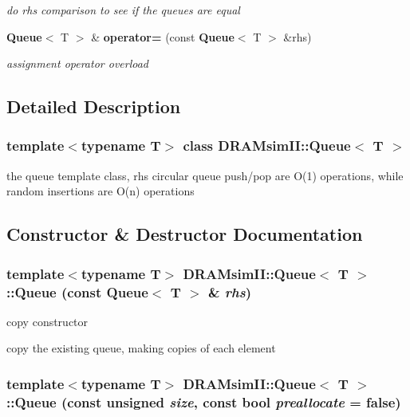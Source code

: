 \begin{DoxyCompactItemize}
\begin{DoxyCompactList}\small\item\em do rhs comparison to see if the queues are equal \item\end{DoxyCompactList}\item 
{\bf Queue}$<$ T $>$ \& {\bf operator=} (const {\bf Queue}$<$ T $>$ \&rhs)
\begin{DoxyCompactList}\small\item\em assignment operator overload \item\end{DoxyCompactList}\end{DoxyCompactItemize}


\subsection{Detailed Description}
\subsubsection*{template$<$typename T$>$ class DRAMsimII::Queue$<$ T $>$}

the queue template class, rhs circular queue push/pop are O(1) operations, while random insertions are O(n) operations 

\subsection{Constructor \& Destructor Documentation}
\subsubsection[{Queue}]{\setlength{\rightskip}{0pt plus 5cm}template$<$typename T$>$ {\bf DRAMsimII::Queue}$<$ T $>$::{\bf Queue} (const {\bf Queue}$<$ T $>$ \& {\em rhs})\hspace{0.3cm}{\ttfamily  [inline, explicit]}}\label{class_d_r_a_msim_i_i_1_1_queue_aa43f7ac274a3432a36b8f275ce27d67c}


copy constructor 

copy the existing queue, making copies of each element 
\subsubsection[{Queue}]{\setlength{\rightskip}{0pt plus 5cm}template$<$typename T$>$ {\bf DRAMsimII::Queue}$<$ T $>$::{\bf Queue} (const unsigned {\em size}, \/  const bool {\em preallocate} = {\ttfamily false})\hspace{0.3cm}{\ttfamily  [inline, explicit]}}\label{class_d_r_a_msim_i_i_1_1_queue_a166d590604d089637db1304f11167b5a}


